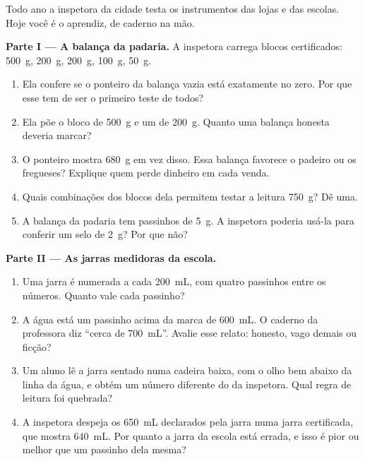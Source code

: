 \begin{problem}\label{pb:g6:measurement-in-science:1}
Todo ano a inspetora da cidade testa os instrumentos das lojas e das
escolas. Hoje você é o aprendiz, de caderno na mão.

\medskip\noindent\textbf{Parte I --- A balança da padaria.}
A inspetora carrega blocos certificados: \qty{500}{g}, \qty{200}{g},
\qty{200}{g}, \qty{100}{g}, \qty{50}{g}.
\begin{enumerate}
  \item Ela confere se o ponteiro da balança vazia está exatamente
        no zero. Por que esse tem de ser o primeiro teste de todos?
  \item Ela põe o bloco de \qty{500}{g} e um de \qty{200}{g}. Quanto
        uma balança honesta deveria marcar?
  \item O ponteiro mostra \qty{680}{g} em vez disso. Essa balança
        favorece o padeiro ou os fregueses? Explique quem perde
        dinheiro em cada venda.
  \item Quais combinações dos blocos dela permitem testar a leitura
        \qty{750}{g}? Dê uma.
  \item A balança da padaria tem passinhos de \qty{5}{g}. A
        inspetora poderia usá-la para conferir um selo de
        \qty{2}{g}? Por que não?
\end{enumerate}

\medskip\noindent\textbf{Parte II --- As jarras medidoras da escola.}
\begin{enumerate}[resume]
  \item Uma jarra é numerada a cada \qty{200}{mL}, com quatro
        passinhos entre os números. Quanto vale cada passinho?
  \item A água está um passinho acima da marca de \qty{600}{mL}. O
        caderno da professora diz ``cerca de \qty{700}{mL}''.
        Avalie esse relato: honesto, vago demais ou ficção?
  \item Um aluno lê a jarra sentado numa cadeira baixa, com o olho
        bem abaixo da linha da água, e obtém um número diferente do
        da inspetora. Qual regra de leitura foi quebrada?
  \item A inspetora despeja os \qty{650}{mL} declarados pela jarra
        numa jarra certificada, que mostra \qty{640}{mL}. Por quanto
        a jarra da escola está errada, e isso é pior ou melhor que
        um passinho dela mesma?
\end{enumerate}


\end{problem}
